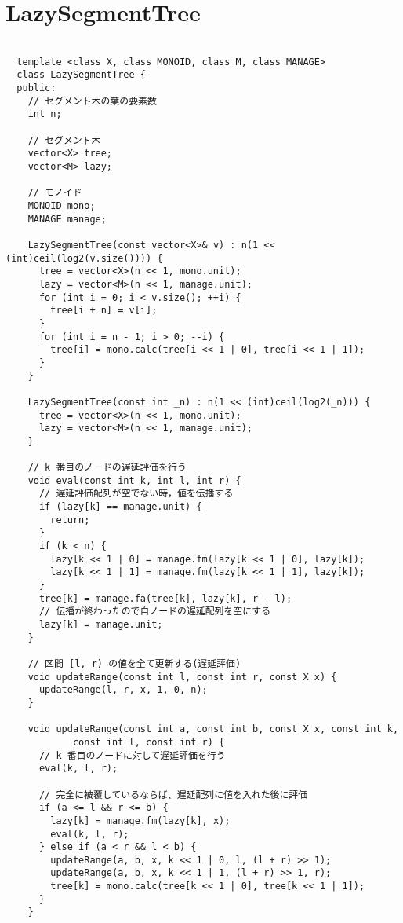 \documentclass{jsarticle}
\begin{document}
\section{LazySegmentTree}
\color{black}
\begin{lstlisting}[caption=LazySegmentTree]

  template <class X, class MONOID, class M, class MANAGE>
  class LazySegmentTree {
  public:
    // セグメント木の葉の要素数
    int n;
  
    // セグメント木
    vector<X> tree;
    vector<M> lazy;
  
    // モノイド
    MONOID mono;
    MANAGE manage;
  
    LazySegmentTree(const vector<X>& v) : n(1 << (int)ceil(log2(v.size()))) {
      tree = vector<X>(n << 1, mono.unit);
      lazy = vector<M>(n << 1, manage.unit);
      for (int i = 0; i < v.size(); ++i) {
        tree[i + n] = v[i];
      }
      for (int i = n - 1; i > 0; --i) {
        tree[i] = mono.calc(tree[i << 1 | 0], tree[i << 1 | 1]);
      }
    }
  
    LazySegmentTree(const int _n) : n(1 << (int)ceil(log2(_n))) {
      tree = vector<X>(n << 1, mono.unit);
      lazy = vector<M>(n << 1, manage.unit);
    }
  
    // k 番目のノードの遅延評価を行う
    void eval(const int k, int l, int r) {
      // 遅延評価配列が空でない時，値を伝播する
      if (lazy[k] == manage.unit) {
        return;
      }
      if (k < n) {
        lazy[k << 1 | 0] = manage.fm(lazy[k << 1 | 0], lazy[k]);
        lazy[k << 1 | 1] = manage.fm(lazy[k << 1 | 1], lazy[k]);
      }
      tree[k] = manage.fa(tree[k], lazy[k], r - l);
      // 伝播が終わったので自ノードの遅延配列を空にする
      lazy[k] = manage.unit;
    }
  
    // 区間 [l, r) の値を全て更新する(遅延評価)
    void updateRange(const int l, const int r, const X x) {
      updateRange(l, r, x, 1, 0, n);
    }
  
    void updateRange(const int a, const int b, const X x, const int k,
            const int l, const int r) {
      // k 番目のノードに対して遅延評価を行う
      eval(k, l, r);
  
      // 完全に被覆しているならば、遅延配列に値を入れた後に評価
      if (a <= l && r <= b) {
        lazy[k] = manage.fm(lazy[k], x);
        eval(k, l, r);
      } else if (a < r && l < b) {
        updateRange(a, b, x, k << 1 | 0, l, (l + r) >> 1);
        updateRange(a, b, x, k << 1 | 1, (l + r) >> 1, r);
        tree[k] = mono.calc(tree[k << 1 | 0], tree[k << 1 | 1]);
      }
    }
  

\end{lstlisting}
\end{document}
